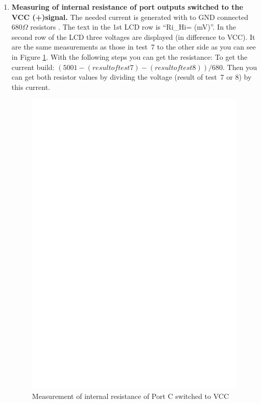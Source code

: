 \begin{enumerate}
\item {\bf Measuring of internal resistance of port outputs switched to the VCC (+)signal.}
The needed current is generated with to GND connected \(680\Omega\) resistors .
The text in the 1st LCD row is ``Ri\_Hi= (mV)''. In the second row of the LCD three voltages are displayed (in difference to VCC).
It are the same measurements as those in test~7 to the other side as you can see in Figure \ref{fig:test8}.
With the following steps you can get the resistance:
To get the current build:  \((5001 - (result of test 7) - (result of test 8)) / 680\).
Then you can get both resistor values by dividing the voltage (result of test~7 or 8) by this current.
\begin{figure}[H]
\centering
\includegraphics[]{../FIG/Test8.eps}
\caption{Measurement of internal resistance of Port C switched to VCC }
\label{fig:test8}
\end{figure}


\end{enumerate}

